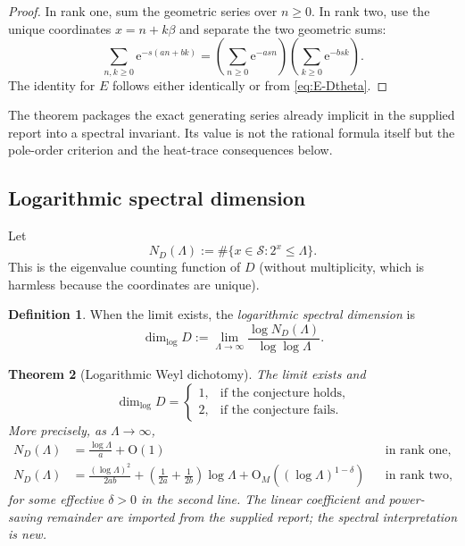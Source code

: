 \documentclass[11pt,oneside]{article}
\newtheorem{theorem}{Theorem}[section]
\theoremstyle{definition}
\newtheorem{definition}[theorem]{Definition}
\theoremstyle{remark}
\newcommand{\Sol}{\mathcal S}
\newcommand{\e}{\mathrm e}
\newcommand{\bigO}{\mathrm O}
\begin{document}
\begin{proof}
In rank one, sum the geometric series over $n\ge0$.  In rank two, use the unique coordinates $x=n+k\beta$ and separate the two geometric sums:
\[
 \sum_{n,k\ge0}\e^{-s(an+bk)}
 =\left(\sum_{n\ge0}\e^{-asn}\right)
  \left(\sum_{k\ge0}\e^{-bsk}\right).
\]
The identity for $E$ follows either identically or from \eqref{eq:E-Dtheta}.
\end{proof}

The theorem packages the exact generating series already implicit in the supplied report into a spectral invariant.  Its value is not the rational formula itself but the pole-order criterion and the heat-trace consequences below.

\subsection{Logarithmic spectral dimension}

Let
\[
  N_D(\Lambda):=\#\{x\in\Sol:2^x\le\Lambda\}.
\]
This is the eigenvalue counting function of $D$ (without multiplicity, which is harmless because the coordinates are unique).

\begin{definition}
When the limit exists, the \emph{logarithmic spectral dimension} is
\[
  \dim_{\log}D
  :=\lim_{\Lambda\to\infty}
     \frac{\log N_D(\Lambda)}{\log\log\Lambda}.
\]
\end{definition}

\begin{theorem}[Logarithmic Weyl dichotomy]
\label{thm:log-Weyl}
The limit exists and
\[
 \dim_{\log}D=
 \begin{cases}
  1,&\text{if the conjecture holds},\\
  2,&\text{if the conjecture fails}.
 \end{cases}
\]
More precisely, as $\Lambda\to\infty$,
\begin{align}
 N_D(\Lambda)
   &=\frac{\log\Lambda}{a}+\bigO(1)
       &&\text{in rank one},
       \label{eq:count-rank-one}\\
 N_D(\Lambda)
   &=\frac{(\log\Lambda)^2}{2ab}
     +\left(\frac1{2a}+\frac1{2b}\right)\log\Lambda
     +\bigO_{M}\!\left((\log\Lambda)^{1-\delta}\right)
       &&\text{in rank two},
       \label{eq:count-rank-two}
\end{align}
for some effective $\delta>0$ in the second line.  The linear coefficient and power-saving remainder are imported from the supplied report; the spectral interpretation is new.
\end{theorem}
\end{document}
